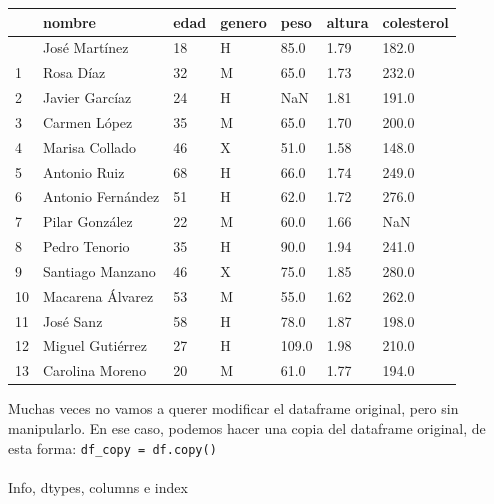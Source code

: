 \documentclass[
  letterpaper,
  DIV=11,
  numbers=noendperiod]{scrreprt}
\makeatletter
\let\oldparagraph\paragraph
\renewcommand{\paragraph}{
    \@ifstar
      \xxxParagraphStar
      \xxxParagraphNoStar
  }
\newcommand{\xxxParagraphStar}[1]{\oldparagraph*{#1}\mbox{}}
\newcommand{\xxxParagraphNoStar}[1]{\oldparagraph{#1}\mbox{}}
\makeatother
\begin{document}
\begin{longtable}[]{@{}lllllll@{}}
\toprule\noalign{}
& nombre & edad & genero & peso & altura & colesterol \\
\midrule\noalign{}
\endhead
\bottomrule\noalign{}
\endlastfoot
0 & José Martínez & 18 & H & 85.0 & 1.79 & 182.0 \\
1 & Rosa Díaz & 32 & M & 65.0 & 1.73 & 232.0 \\
2 & Javier Garcíaz & 24 & H & NaN & 1.81 & 191.0 \\
3 & Carmen López & 35 & M & 65.0 & 1.70 & 200.0 \\
4 & Marisa Collado & 46 & X & 51.0 & 1.58 & 148.0 \\
5 & Antonio Ruiz & 68 & H & 66.0 & 1.74 & 249.0 \\
6 & Antonio Fernández & 51 & H & 62.0 & 1.72 & 276.0 \\
7 & Pilar González & 22 & M & 60.0 & 1.66 & NaN \\
8 & Pedro Tenorio & 35 & H & 90.0 & 1.94 & 241.0 \\
9 & Santiago Manzano & 46 & X & 75.0 & 1.85 & 280.0 \\
10 & Macarena Álvarez & 53 & M & 55.0 & 1.62 & 262.0 \\
11 & José Sanz & 58 & H & 78.0 & 1.87 & 198.0 \\
12 & Miguel Gutiérrez & 27 & H & 109.0 & 1.98 & 210.0 \\
13 & Carolina Moreno & 20 & M & 61.0 & 1.77 & 194.0 \\
\end{longtable}

\hfill\break

\begin{tcolorbox}[enhanced jigsaw, opacitybacktitle=0.6, toptitle=1mm, toprule=.15mm, arc=.35mm, breakable, bottomrule=.15mm, opacityback=0, leftrule=.75mm, rightrule=.15mm, title=\textcolor{quarto-callout-note-color}{\faInfo}\hspace{0.5em}{Note}, left=2mm, bottomtitle=1mm, colframe=quarto-callout-note-color-frame, colback=white, titlerule=0mm, coltitle=black, colbacktitle=quarto-callout-note-color!10!white]

Muchas veces no vamos a querer modificar el dataframe original, pero sin
manipularlo. En ese caso, podemos hacer una copia del dataframe
original, de esta forma: \texttt{df\_copy\ =\ df.copy()}

\end{tcolorbox}

\paragraph{Info, dtypes, columns e
index}\label{info-dtypes-columns-e-index}
\end{document}
